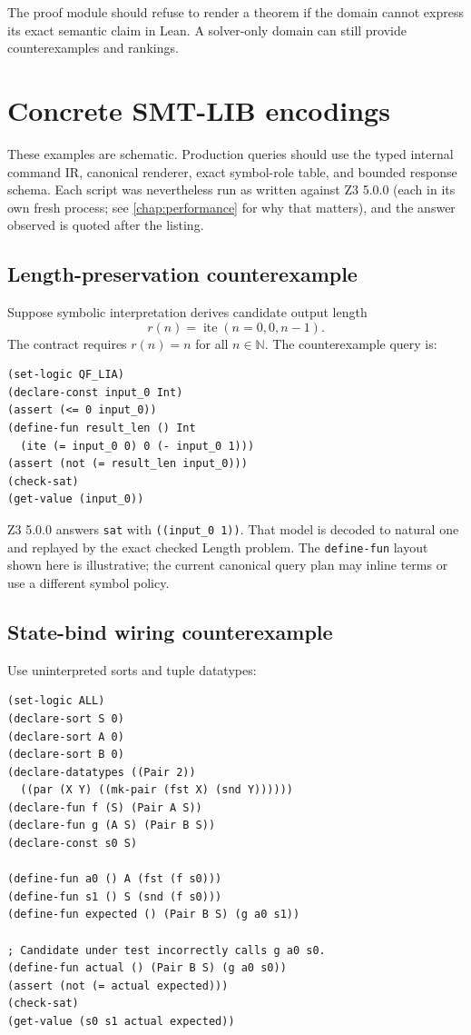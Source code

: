\documentclass[11pt,oneside]{report}
\newcommand{\Nat}{\mathbb{N}}
\newcommand{\code}[1]{\texttt{#1}}
\begin{document}
The proof module should refuse to render a theorem if the domain cannot express its exact semantic claim in Lean. A solver-only domain can still provide counterexamples and rankings.

\chapter{Concrete SMT-LIB encodings}
\label{app:smt}

These examples are schematic. Production queries should use the typed internal command IR, canonical renderer, exact symbol-role table, and bounded response schema. Each script was nevertheless run as written against Z3 5.0.0 (each in its own fresh process; see \cref{chap:performance} for why that matters), and the answer observed is quoted after the listing.

\section{Length-preservation counterexample}

Suppose symbolic interpretation derives candidate output length
\[
  r(n)=\operatorname{ite}(n=0,0,n-1).
\]
The contract requires $r(n)=n$ for all $n\in\Nat$. The counterexample query is:

\begin{lstlisting}[language=SMTLIB,caption={Counterexample query for a length-changing candidate.},label={lst:smt-length}]
(set-logic QF_LIA)
(declare-const input_0 Int)
(assert (<= 0 input_0))
(define-fun result_len () Int
  (ite (= input_0 0) 0 (- input_0 1)))
(assert (not (= result_len input_0)))
(check-sat)
(get-value (input_0))
\end{lstlisting}

Z3 5.0.0 answers \texttt{sat} with \code{((input\_0 1))}. That model is decoded to natural one and replayed by the exact checked Length problem. The \code{define-fun} layout shown here is illustrative; the current canonical query plan may inline terms or use a different symbol policy.

\section{State-bind wiring counterexample}

Use uninterpreted sorts and tuple datatypes:

\begin{lstlisting}[language=SMTLIB,caption={Relational state-bind counterexample.},label={lst:smt-state}]
(set-logic ALL)
(declare-sort S 0)
(declare-sort A 0)
(declare-sort B 0)
(declare-datatypes ((Pair 2))
  ((par (X Y) ((mk-pair (fst X) (snd Y))))))
(declare-fun f (S) (Pair A S))
(declare-fun g (A S) (Pair B S))
(declare-const s0 S)

(define-fun a0 () A (fst (f s0)))
(define-fun s1 () S (snd (f s0)))
(define-fun expected () (Pair B S) (g a0 s1))

; Candidate under test incorrectly calls g a0 s0.
(define-fun actual () (Pair B S) (g a0 s0))
(assert (not (= actual expected)))
(check-sat)
(get-value (s0 s1 actual expected))
\end{lstlisting}
\end{document}
